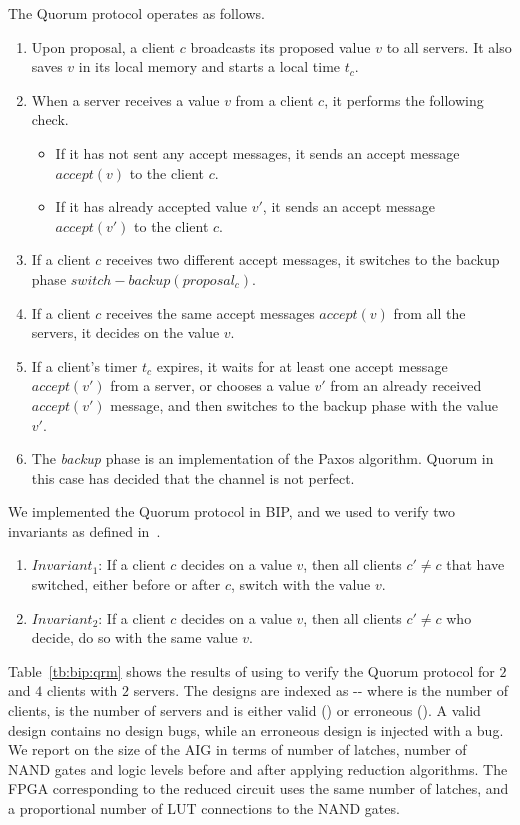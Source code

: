 The Quorum protocol operates as follows.
\begin{enumerate}
 \item Upon proposal, a client $c$ broadcasts its proposed value 
 $v$ to all servers. It also saves $v$ in its local memory and starts a local time
 $t_c$. 
 \item When a server receives a value $v$ from a client $c$, it performs
 the following check.
 \begin{itemize}
  \item If it has not sent any accept messages, it sends an accept message
  $\mathit{accept}(v)$ to the client $c$. 
  \item If it has already accepted value $v'$, it sends an accept message
  $\mathit{accept}(v')$ to the client $c$. 
 \end{itemize}
 \item If a client $c$ receives two different accept messages, it switches
 to the backup phase $\mathit{switch-backup}(\mathit{proposal_c})$.
 \item If a client $c$ receives the same accept messages $\mathit{accept}(v)$ from all the servers,
 it decides on the value $v$.
 \item If a client's timer $t_c$ expires, it waits for at least
 one accept message $\mathit{accept}(v')$ from a server, or chooses a value $v'$
 from an already received $\mathit{accept}(v')$ message, and then switches to 
 the backup phase with the value $v'$. 
 \item
 The {\em backup} phase is an implementation of the Paxos algorithm. Quorum in this case has decided that the channel is not perfect. 
\end{enumerate}
%
We implemented the Quorum protocol in BIP, and we used \biptool{} to verify two invariants as defined in~\cite{guerraoui2012speculative}.
\begin{enumerate}
 \item $\mathit{Invariant_1}$: If a client $c$ decides on a value $v$, then all clients 
 $c' \neq c$ that have switched, either before or after $c$, switch with the value $v$.
 \item $\mathit{Invariant_2}$: If a client $c$ decides on a value $v$, then all clients
 $c' \neq c$ who decide, do so with the same value $v$. 
\end{enumerate}
%
Table~\ref{tb:bip:qrm} shows the results of using \biptool{} to verify the 
Quorum protocol for $2$ and $4$ clients with $2$ servers. The designs
are indexed as -- where 
 is the number of clients,  is the number of 
servers and  is either valid () or erroneous ().
A valid design contains no design bugs, while an erroneous design is injected
with a bug.
We report on the size of the AIG in terms of number of latches,
number of NAND gates and logic levels before and after
applying reduction algorithms.
The FPGA corresponding to the reduced circuit uses the same number of latches, 
and a proportional number of LUT connections to the NAND gates. 

